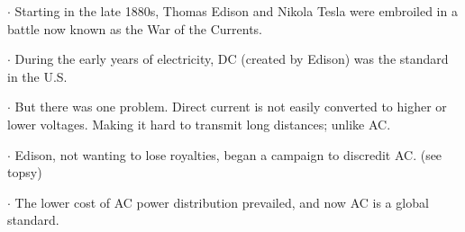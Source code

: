 \documentclass[preview]{standalone}
\begin{document}
\centering \begin{flushleft} $\cdot$ Starting in the late 1880s, Thomas Edison and Nikola Tesla were embroiled in a battle now known as the War of the Currents.\end{flushleft} \begin{flushleft} $\cdot$ During the early years of electricity, DC (created by Edison) was the standard in the U.S.\end{flushleft} \begin{flushleft} $\cdot$ But there was one problem. Direct current is not easily converted to higher or lower voltages. Making it hard to transmit long distances; unlike AC.\end{flushleft} \begin{flushleft} $\cdot$ Edison, not wanting to lose royalties, began a campaign to discredit AC. (see topsy)\end{flushleft} \begin{flushleft} $\cdot$ The lower cost of AC power distribution prevailed, and now AC is a global standard.\end{flushleft}
\end{document}
